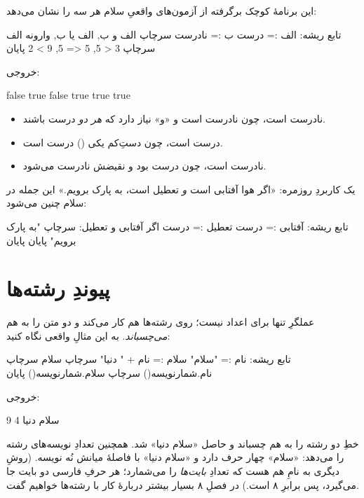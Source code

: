 این برنامهٔ کوچک برگرفته از آزمون‌های واقعیِ سلام هر سه را نشان می‌دهد:

\begin{salamfa}
تابع ریشه:
    الف := درست
    ب := نادرست
    سرچاپ الف و ب, الف یا ب, وارونه الف
    سرچاپ 3 < 5, 5 <= 5, 9 > 2
پایان
\end{salamfa}

خروجی:

\begin{salamen}[language={}]
false true false
true true true
\end{salamen}

\begin{itemize}
  \item {} نادرست است، چون  نادرست است و «و» نیاز دارد
        که \emph{هر دو} درست باشند.
  \item {} درست است، چون دستِ‌کم یکی () درست است.
  \item {} نادرست است، چون  درست بود و نقیضش نادرست می‌شود.
\end{itemize}

\begin{tip}
یک کاربردِ روزمره: «اگر هوا آفتابی است \emph{و} تعطیل است، به پارک برویم.» این
جمله در سلام چنین می‌شود:
\begin{salamfa}
تابع ریشه:
    آفتابی := درست
    تعطیل := درست
    اگر آفتابی و تعطیل:
        سرچاپ "به پارک برویم"
    پایان
پایان
\end{salamfa}
\end{tip}

\section{پیوندِ رشته‌ها}

عملگرِ \code{+} تنها برای اعداد نیست؛ روی رشته‌ها هم کار می‌کند و دو متن را به
هم \emph{می‌چسباند}. به این مثالِ واقعی نگاه کنید:

\begin{salamfa}
تابع ریشه:
    نام := "سلام"
    سلام := نام + " دنیا"
    سرچاپ سلام
    سرچاپ نام.شمارنویسه()
    سرچاپ سلام.شمارنویسه()
پایان
\end{salamfa}

خروجی:

\begin{salamen}[language={}]
سلام دنیا
4
9
\end{salamen}

خطِ  دو رشته را به هم چسباند و حاصل «سلام دنیا» شد. همچنین
 تعدادِ نویسه‌های رشته را می‌دهد: «سلام» چهار حرف دارد و
«سلام دنیا» با فاصلهٔ میانش نُه نویسه. (روشِ دیگری به نامِ  هم هست
که تعدادِ \emph{بایت‌ها} را می‌شمارد؛ هر حرفِ فارسی دو بایت جا می‌گیرد، پس
 برابرِ ۸ است.) در فصلِ ۸ بسیار بیشتر دربارهٔ کار با رشته‌ها
خواهیم گفت.

